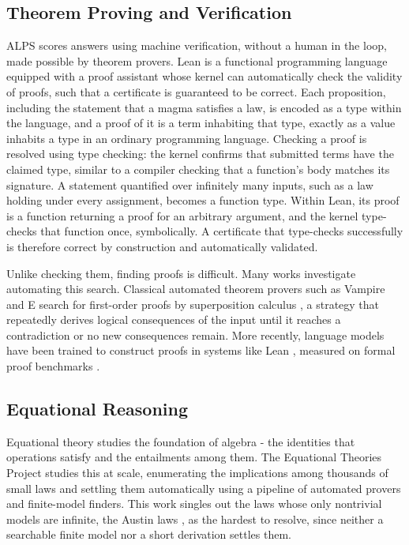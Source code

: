 \documentclass[letterpaper]{article} %
\begin{document}
\subsection{Theorem Proving and Verification}
ALPS scores answers using machine verification, without a human in the loop, made possible by theorem provers. Lean \citep{moura2021lean} is a functional programming language equipped with a proof assistant whose kernel can automatically check the validity of proofs, such that a certificate is guaranteed to be correct. Each proposition, including the statement that a magma satisfies a law, is encoded as a type within the language, and a proof of it is a term inhabiting that type, exactly as a value inhabits a type in an ordinary programming language. Checking a proof is resolved using type checking: the kernel confirms that submitted terms have the claimed type, similar to a compiler checking that a function's body matches its signature. A statement quantified over infinitely many inputs, such as a law holding under every assignment, becomes a function type. Within Lean, its proof is a function returning a proof for an arbitrary argument, and the kernel type-checks that function once, symbolically. A certificate that type-checks successfully is therefore correct by construction and automatically validated. 

Unlike checking them, finding proofs is difficult. Many works investigate automating this search. Classical automated theorem provers such as Vampire and E \citep{kovacs2013first, schulz2019faster} search for first-order proofs by superposition calculus \citep{bachmair1994rewrite}, a strategy that repeatedly derives logical consequences of the input until it reaches a contradiction or no new consequences remain. More recently, language models have been trained to construct proofs in systems like Lean \citep{yang2023leandojo, xin2024deepseek, hubert2026olympiad}, measured on formal proof benchmarks \citep{zheng2021minif2f}. 


\subsection{Equational Reasoning}
Equational theory studies the foundation of algebra - the identities that operations satisfy and the entailments among them. The Equational Theories Project \citep{bolan2025equational} studies this at scale, enumerating the implications among thousands of small laws and settling them automatically using a pipeline of automated provers and finite-model finders. This work singles out the laws whose only nontrivial models are infinite, the Austin laws \citep{kisielewicz1997austin}, as the hardest to resolve, since neither a searchable finite model nor a short derivation settles them. 
\end{document}
